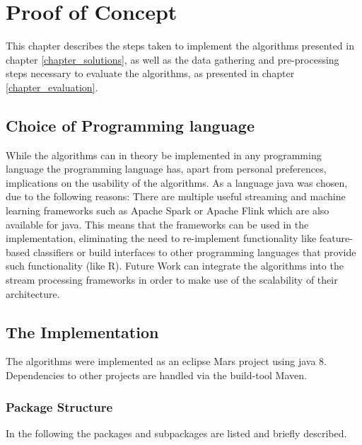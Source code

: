 \chapter{Proof of Concept}
\label{chapter_proofOfConcept}

\ifpdf
    \graphicspath{{Chapter5/Figs/Raster/}{Chapter5/Figs/PDF/}{Chapter5/Figs/}}
\else
    \graphicspath{{Chapter5/Figs/Vector/}{Chapter5/Figs/}}
\fi

This chapter describes the steps taken to implement the algorithms presented in chapter \ref{chapter_solutions}, as well as the data gathering and pre-processing steps necessary to evaluate the algorithms, as presented in chapter \ref{chapter_evaluation}.

\section{Choice of Programming language}
While the algorithms can in theory be implemented in any programming language the programming language has, apart from personal preferences, implications on the usability of the algorithms. As a language java was chosen, due to the following reasons: There are multiple useful streaming and machine learning frameworks such as Apache Spark \cite{meng2016mllib} or Apache Flink \cite{carbone2015apache} which are also available for java. This means that the frameworks can be used in the implementation, eliminating the need to re-implement functionality like feature-based classifiers or build interfaces to other programming languages that provide such functionality (like R). Future Work can integrate the algorithms into the stream processing frameworks in order to make use of the scalability of their architecture.

\section{The Implementation}

The algorithms were implemented as an eclipse Mars project using java 8. Dependencies to other projects are handled via the build-tool Maven. 

\subsection{Package Structure}

In the following the packages and subpackages are listed and briefly described.

